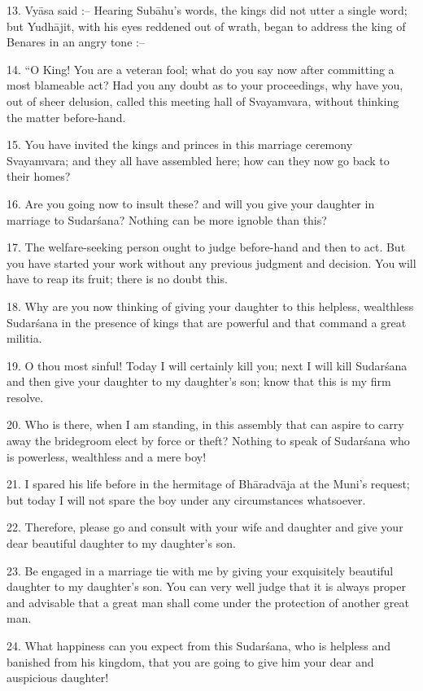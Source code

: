 13. Vy\=asa said :-- Hearing Sub\=ahu's words, the kings did not utter a single word; but Yudh\=ajit, with his eyes reddened out of wrath, began to address the king of Benares in an angry tone :--

14. ``O King! You are a veteran fool; what do you say now after committing a most blameable act? Had you any doubt as to your proceedings, why have you, out of sheer delusion, called this meeting hall of Svayamvara, without thinking the matter before-hand.

15. You have invited the kings and princes in this marriage ceremony Svayamvara; and they all have assembled here; how can they now go back to their homes?

16. Are you going now to insult these? and will you give your daughter in marriage to Sudar\'sana? Nothing can be more ignoble than this?

17. The welfare-seeking person ought to judge before-hand and then to act. But you have started your work without any previous judgment and decision. You will have to reap its fruit; there is no doubt this.

18. Why are you now thinking of giving your daughter to this helpless, wealthless Sudar\'sana in the presence of kings that are powerful and that command a great militia.

19. O thou most sinful! Today I will certainly kill you; next I will kill Sudar\'sana and then give your daughter to my daughter's son; know that this is my firm resolve.

20. Who is there, when I am standing, in this assembly that can aspire to carry away the bridegroom elect by force or theft? Nothing to speak of Sudar\'sana who is powerless, wealthless and a mere boy!

21. I spared his life before in the hermitage of Bh\=aradv\=aja at the Muni's request; but today I will not spare the boy under any circumstances whatsoever.

22. Therefore, please go and consult with your wife and daughter and give your dear beautiful daughter to my daughter's son.

23. Be engaged in a marriage tie with me by giving your exquisitely beautiful daughter to my daughter's son. You can very well judge that it is always proper and advisable that a great man shall come under the protection of another great man.

24. What happiness can you expect from this Sudar\'sana, who is helpless and banished from his kingdom, that you are going to give him your dear and auspicious daughter!

